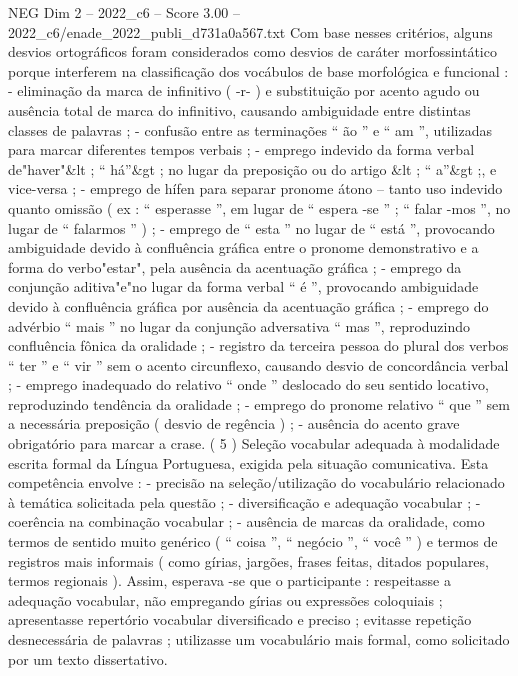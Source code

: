 \begin{textsample}{NEG Dim 2 – 2022\_c6 – Score 3.00 – 2022\_c6/enade\_2022\_publi\_d731a0a567.txt}
Com base nesses critérios, alguns desvios ortográficos foram considerados como desvios de caráter morfossintático porque interferem na classificação dos vocábulos de base morfológica e funcional : - eliminação da marca de infinitivo ( -r- ) e substituição por acento agudo ou ausência total de marca do infinitivo, causando ambiguidade entre distintas classes de palavras ; - confusão entre as terminações “ ão ” e “ am ”, utilizadas para marcar diferentes tempos verbais ; - emprego indevido da forma verbal de"haver"\&lt ; “ há”\&gt ; no lugar da preposição ou do artigo \&lt ; “ a”\&gt ;, e vice-versa ; - emprego de hífen para separar pronome átono – tanto uso indevido quanto omissão ( ex : “ esperasse ”, em lugar de “ espera -se ” ; “ falar -mos ”, no lugar de “ falarmos ” ) ; - emprego de “ esta ” no lugar de “ está ”, provocando ambiguidade devido à confluência gráfica entre o pronome demonstrativo e a forma do verbo"estar", pela ausência da acentuação gráfica ; - emprego da conjunção aditiva"e"no lugar da forma verbal “ é ”, provocando ambiguidade devido à confluência gráfica por ausência da acentuação gráfica ; - emprego do advérbio “ mais ” no lugar da conjunção adversativa “ mas ”, reproduzindo confluência fônica da oralidade ; - registro da terceira pessoa do plural dos verbos “ ter ” e “ vir ” sem o acento circunflexo, causando desvio de concordância verbal ; - emprego inadequado do relativo “ onde ” deslocado do seu sentido locativo, reproduzindo tendência da oralidade ; - emprego do pronome relativo “ que ” sem a necessária preposição ( desvio de regência ) ; - ausência do acento grave obrigatório para marcar a crase. ( 5 ) Seleção vocabular adequada à modalidade escrita formal da Língua Portuguesa, exigida pela situação comunicativa.
Esta competência envolve : - precisão na seleção/utilização do vocabulário relacionado à temática solicitada pela questão ; - diversificação e adequação vocabular ; - coerência na combinação vocabular ; - ausência de marcas da oralidade, como termos de sentido muito genérico ( “ coisa ”, “ negócio ”, “ você ” ) e termos de registros mais informais ( como gírias, jargões, frases feitas, ditados populares, termos regionais ).
Assim, esperava -se que o participante : respeitasse a adequação vocabular, não empregando gírias ou expressões coloquiais ; apresentasse repertório vocabular diversificado e preciso ; evitasse repetição desnecessária de palavras ; utilizasse um vocabulário mais formal, como solicitado por um texto dissertativo.

\end{textsample}
